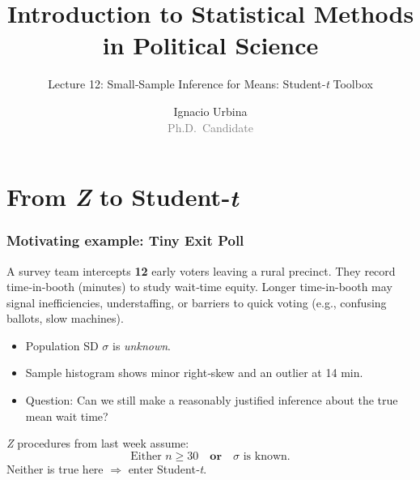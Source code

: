 \documentclass[handout]{beamer}
\title{Introduction to Statistical Methods in Political Science}
\subtitle{Lecture 12: Small‑Sample Inference for Means: Student‑\textit{t} Toolbox}
\author{Ignacio Urbina \texorpdfstring{\\ \vspace{0.3em}}{ }
        \scriptsize \textcolor{gray}{Ph.D.\ Candidate}}
\date{}
\begin{document}
\frame{\titlepage}

\section{From \textit{Z} to Student‑\textit{t}}


\begin{frame}
\frametitle{Motivating example: Tiny Exit Poll}
\small
A survey team intercepts \textbf{12} early voters leaving a rural precinct.  They record time‑in‑booth (minutes) to study wait‑time equity. Longer time-in-booth may signal inefficiencies, understaffing, or barriers to quick voting (e.g., confusing ballots, slow machines).
\begin{itemize}
  \item Population SD \(\sigma\) is \emph{unknown}.
  \item Sample histogram shows minor right‑skew and an outlier at 14 min.
  \item Question: Can we still make a reasonably justified inference about the true mean wait time?
\end{itemize}
\pause
\textit{Z} procedures from last week assume:
\[
\text{Either } n\ge 30 \quad \textbf{or}\quad \sigma \text{ is known}.
\]
Neither is true here \(\Longrightarrow\) enter Student‑\textit{t}.
\end{frame}
\end{document}
